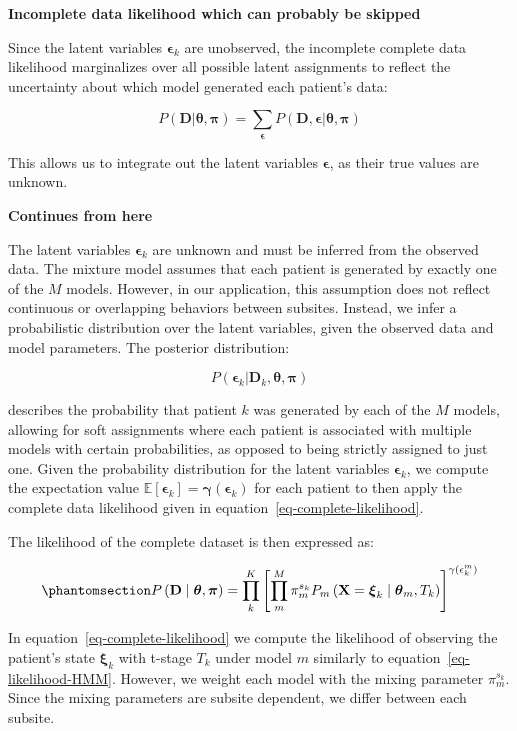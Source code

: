 \documentclass[
  sn-mathphys-num,
]{sn-jnl}
\begin{document}
\textbf{Incomplete data likelihood which can probably be skipped}

Since the latent variables \(\boldsymbol{\epsilon}_k\) are unobserved,
the incomplete complete data likelihood marginalizes over all possible
latent assignments to reflect the uncertainty about which model
generated each patient's data:

\[
P(\mathbf{D} | \boldsymbol{\theta}, \boldsymbol{\pi}) = \sum_{\boldsymbol{\epsilon}} P(\mathbf{D}, \boldsymbol{\epsilon} | \boldsymbol{\theta}, \boldsymbol{\pi})
\]

This allows us to integrate out the latent variables
\(\boldsymbol{\epsilon}\), as their true values are unknown.

\textbf{Continues from here}

The latent variables \(\boldsymbol{\epsilon}_k\) are unknown and must be
inferred from the observed data. The mixture model assumes that each
patient is generated by exactly one of the \(M\) models. However, in our
application, this assumption does not reflect continuous or overlapping
behaviors between subsites. Instead, we infer a probabilistic
distribution over the latent variables, given the observed data and
model parameters. The posterior distribution:

\[
P(\boldsymbol{\epsilon}_k | \mathbf{D}_k, \boldsymbol{\theta}, \boldsymbol{\pi})
\]

describes the probability that patient \(k\) was generated by each of
the \(M\) models, allowing for soft assignments where each patient is
associated with multiple models with certain probabilities, as opposed
to being strictly assigned to just one. Given the probability
distribution for the latent variables \(\boldsymbol{\epsilon}_k\), we
compute the expectation value
\(\mathbb{E}[\boldsymbol{\epsilon}_k] = \boldsymbol{\gamma}(\boldsymbol{\epsilon}_k)\)
for each patient to then apply the complete data likelihood given in
equation~\ref{eq-complete-likelihood}.

The likelihood of the complete dataset is then expressed as:

\begin{equation}\phantomsection\label{eq-complete-likelihood-explicite}{
P \left( \mathbf{D} \mid \boldsymbol{\theta}, \boldsymbol{\pi}\right) = \prod_k^K \left[ \prod_{m}^M \pi_m^{s_k} P_m \left( \mathbf{X}=\boldsymbol{\xi}_k \mid \boldsymbol{\theta}_m, T_k \right) \right]^{\gamma(\epsilon_k^m)} 
}\end{equation}

In equation~\ref{eq-complete-likelihood} we compute the likelihood of
observing the patient's state \(\boldsymbol{\xi}_k\) with t-stage
\(T_k\) under model \(m\) similarly to equation~\ref{eq-likelihood-HMM}.
However, we weight each model with the mixing parameter \(\pi_m^{s_k}\).
Since the mixing parameters are subsite dependent, we differ between
each subsite.
\end{document}
